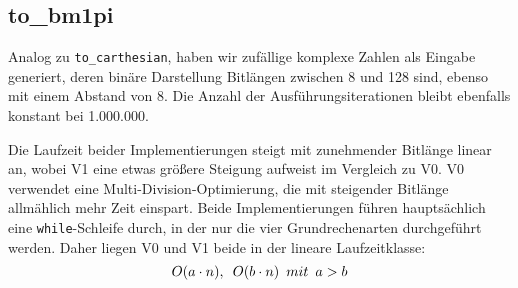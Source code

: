 \documentclass[course=erap]{aspdoc}
\begin{document}
\subsection{to\_bm1pi}
Analog zu \texttt{to\_carthesian}, haben wir zufällige komplexe Zahlen als Eingabe generiert, deren binäre Darstellung Bitlängen zwischen 8 und 128 sind, ebenso mit einem Abstand von 8. Die Anzahl der Ausführungsiterationen bleibt ebenfalls konstant bei 1.000.000. 

    \noindent
    Die Laufzeit beider Implementierungen steigt mit zunehmender Bitlänge linear an, wobei V1 eine etwas größere Steigung aufweist im Vergleich zu V0. V0 verwendet eine Multi-Division-Optimierung, die mit steigender Bitlänge allmählich mehr Zeit einspart. Beide Implementierungen führen hauptsächlich eine \texttt{while}-Schleife durch, in der nur die vier Grundrechenarten durchgeführt werden. Daher liegen V0 und V1 beide in der lineare Laufzeitklasse:
    $$O(a \cdot n),\hspace{0.5em}O(b \cdot n)\hspace{0.5em}mit\hspace{0.5em}a>b$$
\end{document}
